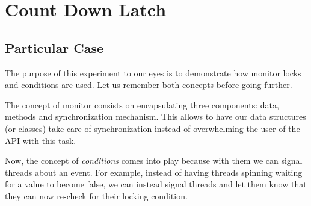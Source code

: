 \section{\textbf{Count Down Latch}}
\subsection{Particular Case}
\par
The purpose of this experiment to our eyes is to demonstrate how monitor locks
and conditions are used. Let us remember both concepts before going further.
\par
The concept of monitor consists on encapsulating three components: data, methods
and synchronization mechanism. This allows to have our data structures (or
classes) take care of synchronization instead of overwhelming the user of the
API with this task. 
\par
Now, the concept of \textit{conditions} comes into play because with them we can
signal threads about an event. For example, instead of having threads spinning
waiting for a value to become false, we can instead signal threads and let them
know that they can now re-check for their locking condition.
\par
